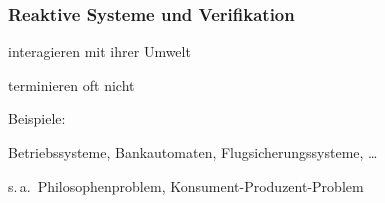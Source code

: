 
    \begin{frame}
      \frametitle{Reaktive Systeme und Verifikation}

      \begin{Itemize}
        \item
          interagieren mit ihrer Umwelt
        \item
          terminieren oft nicht
        \item
          Beispiele:
          \begin{Itemize}
            \item
              Betriebssysteme, Bankautomaten, Flugsicherungssysteme, \dots
            \item
              s.\,a.\ Philosophenproblem, Konsument-Produzent-Problem
          \end{Itemize}
      \end{Itemize}

      \par\bigskip

    \end{frame}

